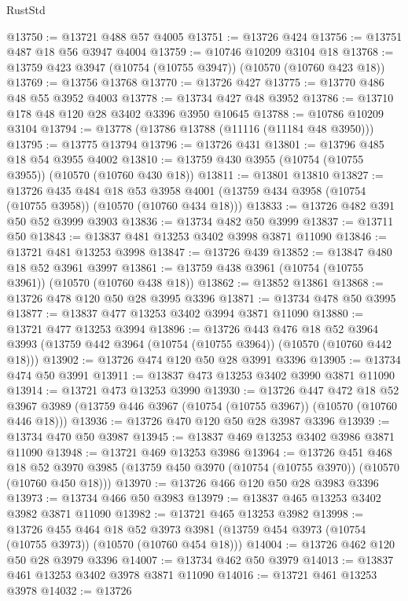 \begin{lexlean}{RustStd}
\begin{coremodule}
@13750 := @13721 @488 @57 @4005
@13751 := @13726 @424
@13756 := @13751 @487 @18 @56 @3947 @4004
@13759 := @10746 @10209 @3104 @18
@13768 := @13759 @423 @3947 (@10754 (@10755 @3947)) (@10570 (@10760 @423 @18))
@13769 := @13756 @13768
@13770 := @13726 @427
@13775 := @13770 @486 @48 @55 @3952 @4003
@13778 := @13734 @427 @48 @3952
@13786 := @13710 @178 @48 @120 @28 @3402 @3396 @3950 @10645
@13788 := @10786 @10209 @3104
@13794 := @13778 (@13786 @13788 (@11116 (@11184 @48 @3950)))
@13795 := @13775 @13794
@13796 := @13726 @431
@13801 := @13796 @485 @18 @54 @3955 @4002
@13810 := @13759 @430 @3955 (@10754 (@10755 @3955)) (@10570 (@10760 @430 @18))
@13811 := @13801 @13810
@13827 := @13726
    @435
    @484
    @18
    @53
    @3958
    @4001
    (@13759 @434 @3958 (@10754 (@10755 @3958)) (@10570 (@10760 @434 @18)))
@13833 := @13726 @482 @391 @50 @52 @3999 @3903
@13836 := @13734 @482 @50 @3999
@13837 := @13711 @50
@13843 := @13837 @481 @13253 @3402 @3998 @3871 @11090
@13846 := @13721 @481 @13253 @3998
@13847 := @13726 @439
@13852 := @13847 @480 @18 @52 @3961 @3997
@13861 := @13759 @438 @3961 (@10754 (@10755 @3961)) (@10570 (@10760 @438 @18))
@13862 := @13852 @13861
@13868 := @13726 @478 @120 @50 @28 @3995 @3396
@13871 := @13734 @478 @50 @3995
@13877 := @13837 @477 @13253 @3402 @3994 @3871 @11090
@13880 := @13721 @477 @13253 @3994
@13896 := @13726
    @443
    @476
    @18
    @52
    @3964
    @3993
    (@13759 @442 @3964 (@10754 (@10755 @3964)) (@10570 (@10760 @442 @18)))
@13902 := @13726 @474 @120 @50 @28 @3991 @3396
@13905 := @13734 @474 @50 @3991
@13911 := @13837 @473 @13253 @3402 @3990 @3871 @11090
@13914 := @13721 @473 @13253 @3990
@13930 := @13726
    @447
    @472
    @18
    @52
    @3967
    @3989
    (@13759 @446 @3967 (@10754 (@10755 @3967)) (@10570 (@10760 @446 @18)))
@13936 := @13726 @470 @120 @50 @28 @3987 @3396
@13939 := @13734 @470 @50 @3987
@13945 := @13837 @469 @13253 @3402 @3986 @3871 @11090
@13948 := @13721 @469 @13253 @3986
@13964 := @13726
    @451
    @468
    @18
    @52
    @3970
    @3985
    (@13759 @450 @3970 (@10754 (@10755 @3970)) (@10570 (@10760 @450 @18)))
@13970 := @13726 @466 @120 @50 @28 @3983 @3396
@13973 := @13734 @466 @50 @3983
@13979 := @13837 @465 @13253 @3402 @3982 @3871 @11090
@13982 := @13721 @465 @13253 @3982
@13998 := @13726
    @455
    @464
    @18
    @52
    @3973
    @3981
    (@13759 @454 @3973 (@10754 (@10755 @3973)) (@10570 (@10760 @454 @18)))
@14004 := @13726 @462 @120 @50 @28 @3979 @3396
@14007 := @13734 @462 @50 @3979
@14013 := @13837 @461 @13253 @3402 @3978 @3871 @11090
@14016 := @13721 @461 @13253 @3978
@14032 := @13726

\end{coremodule}
\end{lexlean}

